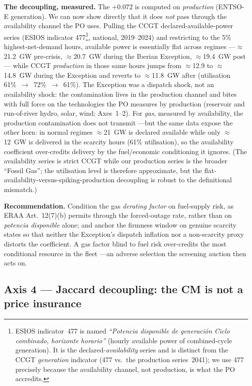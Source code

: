 \documentclass[11pt,a4paper]{article}
\begin{document}
\textbf{The decoupling, measured.} The $+0.072$ is computed on \emph{production}
(ENTSO-E generation). We can now show directly that it does \emph{not} pass through the
availability channel the PO uses. Pulling the CCGT declared-available-power series
(ESIOS indicator 477\footnote{ESIOS indicator~477 is named \emph{``Potencia disponible
de generaci\'on Ciclo combinado, horizonte horario''} (hourly available power of
combined-cycle generation). It is the declared-\emph{availability} series and is distinct
from the CCGT \emph{generation} indicator (477 vs.\ the production series~2041); we use 477
precisely because the availability channel, not production, is what the PO accredits.},
national, 2019--2024) and restricting to the 5\% highest-net-demand
hours, available power is essentially flat across regimes ---$\approx$21.2~GW pre-crisis,
$\approx$20.7~GW during the Iberian Exception, $\approx$19.4~GW post--- while CCGT
\emph{production} in those same hours jumps from $\approx$12.9 to $\approx$14.8~GW during
the Exception and reverts to $\approx$11.8~GW after (utilisation 61\%~$\to$~72\%~$\to$~61\%).
The Exception was a dispatch shock, not an availability shock: the contamination lives in
the production channel and bites with full force on the technologies the PO measures by
production (reservoir and run-of-river hydro, solar, wind; Axes~1--2). For \emph{gas},
measured by availability, the production contamination does not transmit ---but the same
data expose the other horn: in normal regimes $\approx$21~GW is declared available while
only $\approx$12~GW is delivered in the scarcity hours (61\% utilisation), so the
availability coefficient over-credits delivery by the fuel/economic conditioning it
ignores. (The availability series is strict CCGT while our production series is the
broader ``Fossil Gas''; the utilisation level is therefore approximate, but the
flat-availability-versus-spiking-production decoupling is robust to the definitional
mismatch.)

\textbf{Recommendation.} Condition the gas \emph{derating factor} on fuel-supply risk,
as ERAA Art.~12(7)(b) permits through the forced-outage rate, rather than on
\emph{potencia disponible} alone; and anchor the firmness window on genuine scarcity
states so that neither the Exception's dispatch inflation nor a non-scarcity proxy
distorts the coefficient. A gas factor blind to fuel risk over-credits the most
conditional resource in the fleet ---an adverse selection the screening auction then
acts on.

\subsection{Axis 4 --- Jaccard decoupling: the CM is not a price insurance}
\label{sec:eje4}
\end{document}
